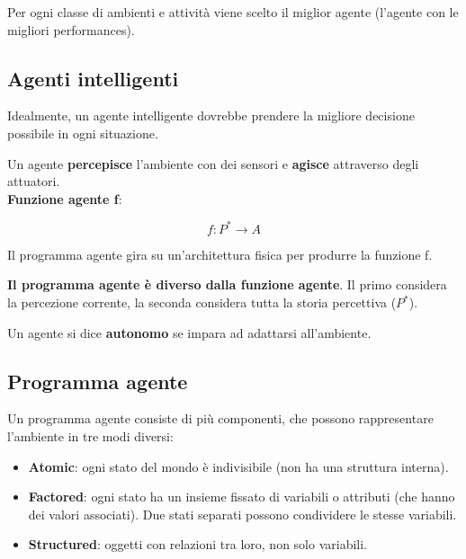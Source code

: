 Per ogni classe di ambienti e attività viene scelto il miglior agente (l'agente
con le migliori performances).

\subsection{Agenti intelligenti}

Idealmente, un agente intelligente dovrebbe prendere la migliore decisione
possibile in ogni situazione.

Un agente \textbf{percepisce} l'ambiente con dei sensori e \textbf{agisce}
attraverso degli attuatori.\\

\textbf{Funzione agente f}:

\begin{equation}
f: P^* \rightarrow A
\end{equation}

Il programma agente gira su un'architettura fisica per produrre la funzione f.

\textbf{Il programma agente è diverso dalla funzione agente}.
Il primo considera la percezione corrente, la seconda considera tutta la
storia percettiva ($P^*$).

Un agente si dice \textbf{autonomo} se impara ad adattarsi all'ambiente.

\subsection{Programma agente}

Un programma agente consiste di più componenti, che possono rappresentare
l'ambiente in tre modi diversi:

\begin{itemize}
 \item \textbf{Atomic}: ogni stato del mondo è indivisibile (non ha una
struttura interna).
 \item \textbf{Factored}: ogni stato ha un insieme fissato di variabili o
attributi (che hanno dei valori associati).
Due stati separati possono condividere le stesse variabili.
 \item \textbf{Structured}: oggetti con relazioni tra loro, non solo
variabili.
\end{itemize}

